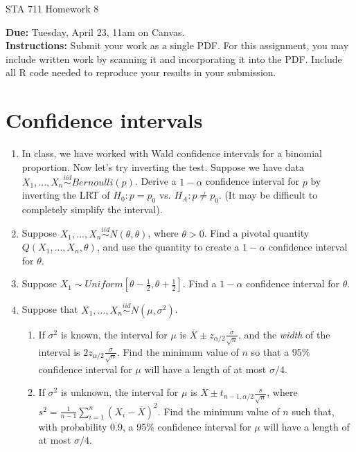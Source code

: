 \documentclass[11pt]{article}
\begin{document}
\begin{center}
\Large
STA 711 Homework 8\\
\normalsize
\vspace{5mm}
\end{center}

\noindent \textbf{Due:} Tuesday, April 23, 11am on Canvas.\\ 

\noindent \textbf{Instructions:} Submit your work as a single PDF. For this assignment, you may include written work by scanning it and incorporating it into the PDF. Include all R code needed to reproduce your results in your submission.

\section*{Confidence intervals}


\begin{enumerate}
\item In class, we have worked with Wald confidence intervals for a binomial proportion. Now let's try inverting the test. Suppose we have data $X_1,...,X_n \overset{iid}{\sim} Bernoulli(p)$. Derive a $1 - \alpha$ confidence interval for $p$ by inverting the LRT of $H_0: p = p_0$ vs. $H_A: p \neq p_0$. (It may be difficult to completely simplify the interval).

\item Suppose $X_1,...,X_n \overset{iid}{\sim} N(\theta, \theta)$, where $\theta > 0$. Find a pivotal quantity $Q(X_1,...,X_n, \theta)$, and use the quantity to create a $1 - \alpha$ confidence interval for $\theta$.

\item Suppose $X_1 \sim Uniform[\theta - \frac{1}{2}, \theta + \frac{1}{2}]$. Find a $1 - \alpha$ confidence interval for $\theta$.

\item Suppose that $X_1,...,X_n \overset{iid}{\sim} N(\mu, \sigma^2)$. 

\begin{enumerate}
\item If $\sigma^2$ is known, the interval for $\mu$ is $\overline{X} \pm z_{\alpha/2} \frac{\sigma}{\sqrt{n}}$, and the \textit{width} of the interval is $2z_{\alpha/2} \frac{\sigma}{\sqrt{n}}$. Find the minimum value of $n$ so that a 95\% confidence interval for $\mu$ will have a length of at most $\sigma/4$.

\item If $\sigma^2$ is unknown, the interval for $\mu$ is $\overline{X} \pm t_{n-1, \alpha/2} \frac{s}{\sqrt{n}}$, where $s^2 = \frac{1}{n-1} \sum \limits_{i=1}^n (X_i - \overline{X})^2$. Find the minimum value of $n$ such that, with probability 0.9, a 95\% confidence interval for $\mu$ will have a length of at most $\sigma/4$.
\end{enumerate}

\end{enumerate}
\end{document}

